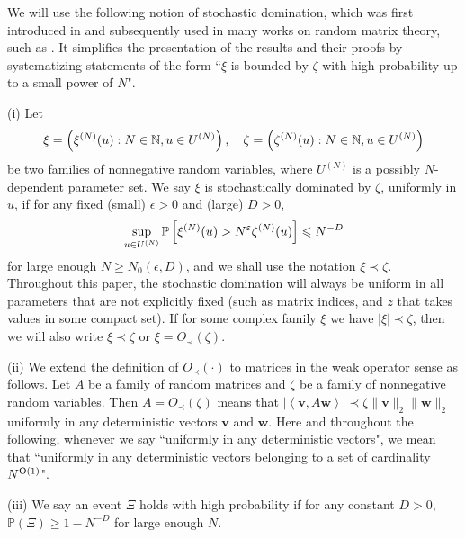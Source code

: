\documentclass{article}
\begin{document}
We will use the following notion of stochastic domination, which was first introduced in \cite{Average_fluc} and subsequently used in many works on random matrix theory, such as \cite{isotropic,principal,local_circular,Delocal,Semicircle,Anisotropic}. It simplifies the presentation of the results and their proofs by systematizing statements of the form ``$\xi$ is bounded by $\zeta$ with high probability up to a small power of $N$".

\begin{definition}\label{stoch_domination}
(i) Let
\[\xi=\left(\xi^{(N)}(u):N\in\operatorname{\mathbb{N}}, u\in U^{(N)}\right),\hskip 10pt \zeta=\left(\zeta^{(N)}(u):N\in\operatorname{\mathbb{N}}, u\in U^{(N)}\right)\]
be two families of nonnegative random variables, where $U^{(N)}$ is a possibly $N$-dependent parameter set. We say $\xi$ is stochastically dominated by $\zeta$, uniformly in $u$, if for any fixed (small) $\epsilon>0$ and (large) $D>0$, 
\[\sup_{u\in U^{(N)}}\operatorname{\mathbb{P}}\left[\xi^{(N)}(u)>N^\varepsilon\zeta^{(N)}(u)\right]\leqslant N^{-D}\]
for large enough $N\ge N_0(\epsilon, D)$, and we shall use the notation $\xi\prec\zeta$. Throughout this paper, the stochastic domination will always be uniform in all parameters that are not explicitly fixed (such as matrix indices, and $z$ that takes values in some compact set). 
If for some complex family $\xi$ we have $|\xi|\prec\zeta$, then we will also write $\xi \prec \zeta$ or $\xi=O_\prec(\zeta)$.

(ii) We extend the definition of $O_\prec(\cdot)$ to matrices in the weak operator sense as follows. Let $A$ be a family of random matrices and $\zeta$ be a family of nonnegative random variables. Then $A=O_\prec(\zeta)$ means that $\left|\left\langle\mathbf v, A\mathbf w\right\rangle\right|\prec\zeta \| \mathbf v\|_2 \|\mathbf w\|_2 $ uniformly in any deterministic vectors $\mathbf v$ and $\mathbf w$. Here and throughout the following, whenever we say ``uniformly in any deterministic vectors", we mean that ``uniformly in any deterministic vectors belonging to a set of cardinality $N^{\operatorname{O}(1)}$".

(iii) We say an event $\Xi$ holds with high probability if for any constant $D>0$, $\mathbb P(\Xi)\ge 1- N^{-D}$ for large enough $N$.
\end{definition}
\end{document}
